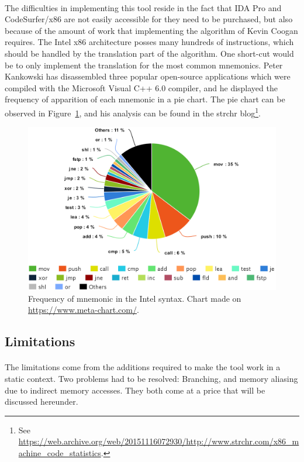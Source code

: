 \paragraph{}
The difficulties in implementing this tool reside in the fact that IDA Pro and CodeSurfer/x86 are not easily accessible for they need to be purchased, but also because of the amount of work that implementing the algorithm of Kevin Coogan requires. The Intel x86 architecture posses many hundreds of instructions, which should be handled by the translation part of the algorithm. One short-cut would be to only implement the translation for the most common mnemonics. Peter Kankowski has disassembled three popular open-source applications which were compiled with the Microsoft Visual C++ 6.0 compiler, and he displayed the frequency of apparition of each mnemonic in a pie chart. The pie chart can be observed in Figure~\ref{fig:mnemonic_frequency}, and his analysis can be found in the strchr blog\footnote{See \url{https://web.archive.org/web/20151116072930/http://www.strchr.com/x86_machine_code_statistics}.}.

\begin{figure}[!htb]
	\centering
	\includegraphics[width=1\textwidth]{contribution/meta-chart.png}
	\caption{Frequency of mnemonic in the Intel syntax. Chart made on \url{https://www.meta-chart.com/}.}
	\label{fig:mnemonic_frequency}
\end{figure}

\pagebreak

\subsection{Limitations}
\paragraph{}
The limitations come from the additions required to make the tool work in a static context. Two problems had to be resolved: Branching, and memory aliasing due to indirect memory accesses. They both come at a price that will be discussed hereunder.

